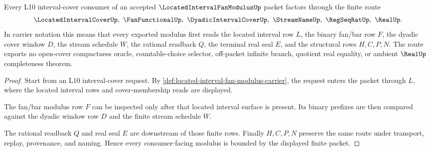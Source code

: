 \begin{theorem}
\label{thm:located-interval-fan-modulus-route}
Every L10 interval-cover consumer of an accepted $\LocatedIntervalFanModulusUp$ packet factors through the finite route
$$
\LocatedIntervalCoverUp,\ \FanFunctionalUp,\ \DyadicIntervalCoverUp,\ \StreamNameUp,\ \RegSeqRatUp,\ \RealUp .
$$
In carrier notation this means that every exported modulus first reads the located interval row $L$, the binary fan/bar row $F$, the dyadic cover window $D$, the stream schedule $W$, the rational readback $Q$, the terminal real seal $E$, and the structural rows $H,C,P,N$. The route exports no open-cover compactness oracle, countable-choice selector, off-packet infinite branch, quotient real equality, or ambient $\RealUp$ completeness theorem.
\end{theorem}
\begin{proof}
Start from an L10 interval-cover request. By \autoref{def:located-interval-fan-modulus-carrier}, the request enters the packet through $L$, where the located interval rows and cover-membership reads are displayed.

The fan/bar modulus row $F$ can be inspected only after that located interval surface is present. Its binary prefixes are then compared against the dyadic window row $D$ and the finite stream schedule $W$.

The rational readback $Q$ and real seal $E$ are downstream of those finite rows. Finally $H,C,P,N$ preserve the same route under transport, replay, provenance, and naming. Hence every consumer-facing modulus is bounded by the displayed finite packet.
\end{proof}



